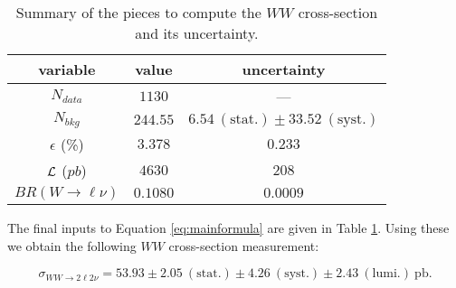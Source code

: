 \begin{table}[!ht]
\begin{center}
\begin{tabular}{|c|c|c|}
\hline
 variable      &  value & uncertainty \\
\hline
$N_{data}$     & $1130$ & ---\\
\hline
$N_{bkg}$      & $244.55$ & $6.54~\mathrm{(stat.)} \pm 33.52~\mathrm{(syst.)}$ \\
\hline
$\epsilon$ (\%) & $3.378$ & $0.233$  \\
\hline
$\cal{L}$ ($pb$) & $4630$ & $208$ \\
\hline
$BR(W \to \ell \nu)$ & $0.1080$ & $0.0009$ \\
\hline
\end{tabular}
\caption{Summary of the pieces to compute the $WW$ cross-section and its uncertainty.}
  \label{tab:xs_summary}
\end{center}
\end{table}

The final inputs to Equation \ref{eq:mainformula} are given in
Table \ref{tab:xs_summary}.  Using these we obtain the following 
$WW$ cross-section measurement:

\begin{equation*}
\sigma_{WW \to 2\ell 2\nu}  = 53.93 \pm 2.05~\mathrm{(stat.)} \pm 4.26~\mathrm{(syst.)} \pm 2.43~\mathrm{(lumi.)~pb}.
\end{equation*}

